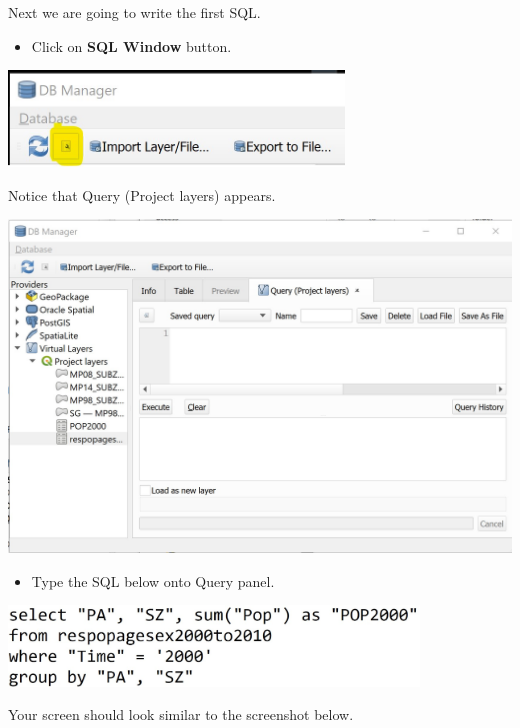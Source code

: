 \documentclass[
  letterpaper,
  DIV=11,
  numbers=noendperiod]{scrreprt}
\providecommand{\tightlist}{%
  \setlength{\itemsep}{0pt}\setlength{\parskip}{0pt}}\usepackage{longtable,booktabs,array}
\begin{document}
Next we are going to write the first SQL.

\begin{itemize}
\tightlist
\item
  Click on \textbf{SQL Window} button.
\end{itemize}

\includegraphics[width=3.51042in,height=\textheight]{./img03/image43.jpg}

Notice that Query (Project layers) appears.

\includegraphics{./img03/image44.jpg}

\begin{itemize}
\tightlist
\item
  Type the SQL below onto Query panel.
\end{itemize}

\includegraphics[width=4.29167in,height=\textheight]{./img03/image45.jpg}

Your screen should look similar to the screenshot below.
\end{document}
